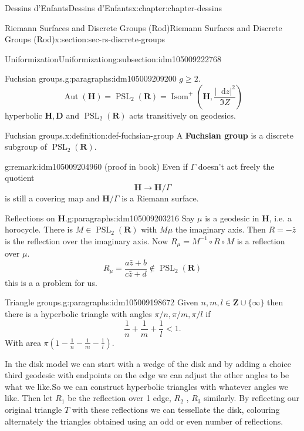 \documentclass[oneside,10pt,]{book}
\newcommand{\terminology}[1]{\textbf{#1}}
\numberwithin{equation}{section}
\newcommand{\diff}{\mathop{}\!\mathrm{d}}
\newcommand{\inv}{^{-1}}
\newcommand{\ZZ}{\mathbf{Z}}
\newcommand{\RR}{\mathbf{R}}
\newcommand{\HH}{\mathbf{H}}
\DeclareMathOperator{\Aut}{Aut}
\DeclareMathOperator{\PSL}{PSL}
\newcommand{\lt}{<}
\begin{document}
\begin{chapterptx}{Dessins d'Enfants}{}{Dessins d'Enfants}{}{}{x:chapter:chapter-dessins}
\begin{sectionptx}{Riemann Surfaces and Discrete Groups (Rod)}{}{Riemann Surfaces and Discrete Groups (Rod)}{}{}{x:section:sec-rs-discrete-groups}
\begin{subsectionptx}{Uniformization}{}{Uniformization}{}{}{g:subsection:idm105009222768}
\begin{paragraphs}{Fuchsian groups.}{g:paragraphs:idm105009209200}%
\(g \ge 2\).%
\begin{equation*}
\Aut (\HH) = \PSL_2(\RR) = \operatorname{Isom}^+ ( \HH, \frac{|\diff z|^2}{\Im Z})
\end{equation*}
hyperbolic \(\HH, \mathbf D\) and \(\PSL_2(\RR)\) acts transitively on geodesics.%
\begin{definition}{Fuchsian groups.}{x:definition:def-fuchsian-group}%
A \terminology{Fuchsian group} is a discrete subgroup of \(\PSL_2(\RR)\).%
\end{definition}
\begin{remark}{}{g:remark:idm105009204960}%
(proof in book) Even if \(\Gamma\) doesn't act freely the quotient%
\begin{equation*}
\HH \to \HH/\Gamma
\end{equation*}
is still a covering map and \(\HH/\Gamma\) is a Riemann surface.%
\end{remark}
\end{paragraphs}%
\begin{paragraphs}{Reflections on \(\HH\).}{g:paragraphs:idm105009203216}%
Say \(\mu\) is a geodesic in \(\HH\), i.e. a horocycle. There is \(M \in \PSL_2(\RR)\) with \(M\mu\) the imaginary axis. Then \(R = -\bar z\) is the reflection  over the imaginary axis. Now \(R_\mu = M\inv\circ R \circ M\) is a reflection over \(\mu\).%
\begin{equation*}
R_\mu = \frac{a\bar z  + b}{ c\bar z + d}\not\in \PSL_2(\RR)
\end{equation*}
this is a a problem for us.%
\end{paragraphs}%
\begin{paragraphs}{Triangle groups.}{g:paragraphs:idm105009198672}%
Given \(n, m, l\in \ZZ \cup \{\infty\}\) then there is a hyperbolic triangle with angles \(\pi/n,\pi/m, \pi/l\) if%
\begin{equation*}
\frac 1n + \frac 1m + \frac 1l \lt 1\text{.}
\end{equation*}
With area \(\pi(1 -  \frac 1n - \frac 1m - \frac 1l)\).%
\par
In the disk model we can start with a wedge of the disk and by adding a choice third geodesic with endpoints on the edge we can adjust the other angles to be what we like.So we can construct hyperbolic triangles with whatever angles we like. Then let \(R_1\) be the reflection over 1 edge, \(R_2\) , \(R_3\) similarly. By reflecting our original triangle \(T\) with these reflections we can tessellate the disk, colouring alternately the triangles obtained using an odd or even number of reflections.%

\end{paragraphs}
\end{subsectionptx}
\end{sectionptx}
\end{chapterptx}
\end{document}
